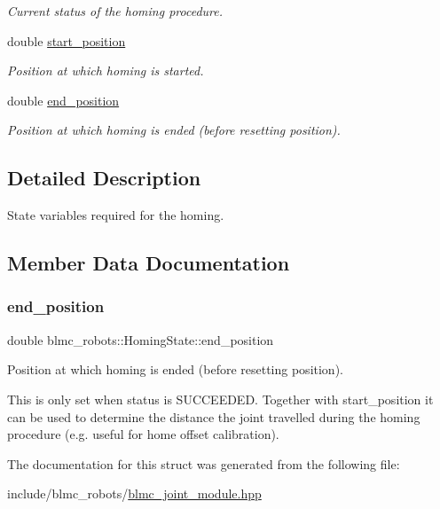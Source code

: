 \begin{DoxyCompactItemize}
\begin{DoxyCompactList}\small\item\em Current status of the homing procedure. \end{DoxyCompactList}\item 
\mbox{\label{structblmc__robots_1_1HomingState_ab93d63495fa2eb534a68b8494f8ce5de}} 
double \hyperlink{structblmc__robots_1_1HomingState_ab93d63495fa2eb534a68b8494f8ce5de}{start\+\_\+position}
\begin{DoxyCompactList}\small\item\em Position at which homing is started. \end{DoxyCompactList}\item 
double \hyperlink{structblmc__robots_1_1HomingState_a2ad975823d6b06b3478f11bf6979a0a6}{end\+\_\+position}
\begin{DoxyCompactList}\small\item\em Position at which homing is ended (before resetting position). \end{DoxyCompactList}\end{DoxyCompactItemize}


\subsection{Detailed Description}
State variables required for the homing. 

\subsection{Member Data Documentation}
\mbox{\label{structblmc__robots_1_1HomingState_a2ad975823d6b06b3478f11bf6979a0a6}} 
\subsubsection{\texorpdfstring{end\+\_\+position}{end\_position}}
{\footnotesize\ttfamily double blmc\+\_\+robots\+::\+Homing\+State\+::end\+\_\+position}



Position at which homing is ended (before resetting position). 

This is only set when status is S\+U\+C\+C\+E\+E\+D\+ED. Together with start\+\_\+position it can be used to determine the distance the joint travelled during the homing procedure (e.\+g. useful for home offset calibration). 

The documentation for this struct was generated from the following file\+:\begin{DoxyCompactItemize}
\item 
include/blmc\+\_\+robots/\hyperlink{blmc__joint__module_8hpp}{blmc\+\_\+joint\+\_\+module.\+hpp}\end{DoxyCompactItemize}
